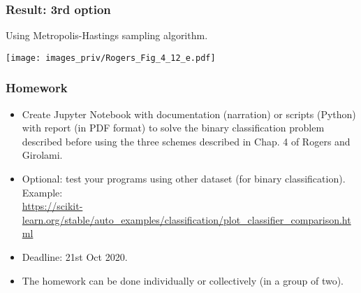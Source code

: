 \documentclass[english,10pt,aspectratio=169,fleqn]{beamer}
\begin{document}
\begin{frame} %
\frametitle{Result: 3rd option}
  
Using Metropolis-Hastings sampling algorithm.
  
{\centering
\texttt{[image: images\_priv/Rogers\_Fig\_4\_12\_e.pdf]}
\par}

\end{frame}


\begin{frame}
\frametitle{Homework}

\begin{itemize}
\item Create Jupyter Notebook with documentation (narration)
or scripts (Python) with report (in PDF format)
to solve the binary classification problem
described before using the three schemes described in Chap. 4 of Rogers and Girolami.
\item Optional: test your programs using other dataset (for binary classification).
Example:\\
{\footnotesize\url{https://scikit-learn.org/stable/auto_examples/classification/plot_classifier_comparison.html}}
\item Deadline: 21st Oct 2020.
\item The homework can be done individually or collectively (in a group of two).
\end{itemize}

\end{frame}
\end{document}
